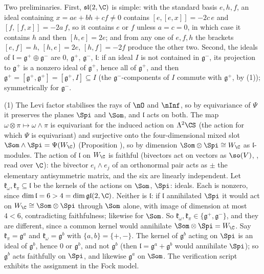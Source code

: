 Two preliminaries. First, $\mathfrak{sl}(2,\C)$ is simple: with the standard basis $e, h, f$, an ideal containing $x = ae + bh + cf \neq 0$ contains $[e,[e,x]] = -2c\,e$ and $[f,[f,x]] = -2a\,f$, so it contains $e$ or $f$ unless $a = c = 0$, in which case it contains $h$ and then $[h,e] = 2e$; and from any one of $e, f, h$ the brackets $[e,f] = h$, $[h,e] = 2e$, $[h,f] = -2f$ produce the other two. Second, the ideals of $\mathfrak{l} = \mathfrak{g}^+\oplus\mathfrak{g}^-$ are $0$, $\mathfrak{g}^+$, $\mathfrak{g}^-$, $\mathfrak{l}$: if an ideal $I$ is not contained in $\mathfrak{g}^-$, its projection to $\mathfrak{g}^+$ is a nonzero ideal of $\mathfrak{g}^+$, hence all of $\mathfrak{g}^+$, and then $\mathfrak{g}^+ = [\mathfrak{g}^+, \mathfrak{g}^+] = [\mathfrak{g}^+, I] \subseteq I$ (the $\mathfrak{g}^-$-components of $I$ commute with $\mathfrak{g}^+$, by (1)); symmetrically for $\mathfrak{g}^-$.

(1) The Levi factor stabilises the rays of $\nO$ and $\nInf$, so by equivariance of $\Psi$ it preserves the planes $\Spi$ and $\Som$, and $\mathfrak{l}$ acts on both. The map $\omega\otimes\pi \mapsto \omega\wedge\pi$ is equivariant for the induced action on $\Lambda^2\CS$ (the action for which $\Psi$ is equivariant) and surjective onto the four-dimensional mixed slot $\Som\wedge\Spi = \Psi(W_\C)$ (Proposition ), so by dimension $\Som\otimes\Spi \cong W_\C$ as $\mathfrak{l}$-modules. The action of $\mathfrak{l}$ on $W_\C$ is faithful (bivectors act on vectors as $\so(V)$, , read over $\C$): the bivector $e_i\wedge e_j$ of an orthonormal pair acts as $\pm$ the elementary antisymmetric matrix, and the six are linearly independent. Let $\mathfrak{k}_\omega, \mathfrak{k}_\pi \subseteq \mathfrak{l}$ be the kernels of the actions on $\Som$, $\Spi$: ideals. Each is nonzero, since $\dim\mathfrak{l} = 6 > 4 = \dim\mathfrak{gl}(2,\C)$. Neither is $\mathfrak{l}$: if $\mathfrak{l}$ annihilated $\Spi$ it would act on $W_\C \cong \Som\otimes\Spi$ through $\Som$ alone, with image of dimension at most $4 < 6$, contradicting faithfulness; likewise for $\Som$. So $\mathfrak{k}_\omega, \mathfrak{k}_\pi \in \{\mathfrak{g}^+, \mathfrak{g}^-\}$, and they are different, since a common kernel would annihilate $\Som\otimes\Spi = W_\C$. Say $\mathfrak{k}_\pi = \mathfrak{g}^a$ and $\mathfrak{k}_\omega = \mathfrak{g}^b$ with $\{a, b\} = \{+,-\}$. The kernel of $\mathfrak{g}^b$ acting on $\Spi$ is an ideal of $\mathfrak{g}^b$, hence $0$ or $\mathfrak{g}^b$, and not $\mathfrak{g}^b$ (then $\mathfrak{l} = \mathfrak{g}^a + \mathfrak{g}^b$ would annihilate $\Spi$); so $\mathfrak{g}^b$ acts faithfully on $\Spi$, and likewise $\mathfrak{g}^a$ on $\Som$. The verification script exhibits the assignment in the Fock model.

